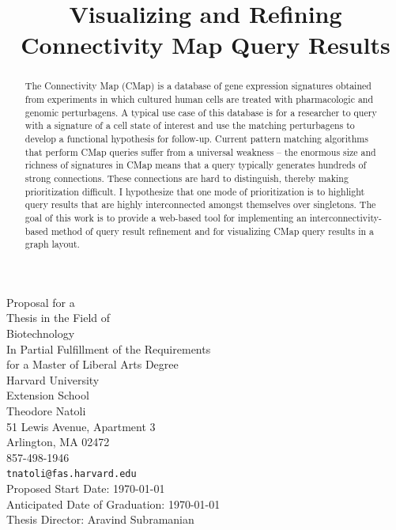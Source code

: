 \documentclass[12pt]{article}
\begin{document}
\title{Visualizing and Refining Connectivity Map Query Results}
\maketitle
\begin{titlepage}
\begin{center}
Proposal for a\\
Thesis in the Field of\\
Biotechnology\\[\baselineskip]
In Partial Fulfillment of the Requirements\\
for a Master of Liberal Arts Degree\\[\baselineskip]
Harvard University\\
Extension School\\[\baselineskip]
Theodore Natoli\\
51 Lewis Avenue, Apartment 3\\
Arlington, MA 02472\\
857-498-1946\\
\texttt{tnatoli@fas.harvard.edu}\\[\baselineskip]
Proposed Start Date: \today\\
Anticipated Date of Graduation: \today\\
Thesis Director: Aravind Subramanian
\end{center}
\end{titlepage}

\begin{abstract}
The Connectivity Map (CMap) is a database of gene expression signatures obtained from experiments in which cultured human cells are treated with pharmacologic and genomic perturbagens. A typical use case of this database is for a researcher to query with a signature of a cell state of interest and use the matching perturbagens to develop a functional hypothesis for follow-up. Current pattern matching algorithms that perform CMap queries suffer from a universal weakness -- the enormous size and richness of signatures in CMap means that a query typically generates hundreds of strong connections. These connections are hard to distinguish, thereby making prioritization difficult. I hypothesize that one mode of prioritization is to highlight query results that are highly interconnected amongst themselves over singletons. The goal of this work is to provide a web-based tool for implementing an interconnectivity-based method of query result refinement and for visualizing CMap query results in a graph layout.
\end{abstract}
\end{document}
